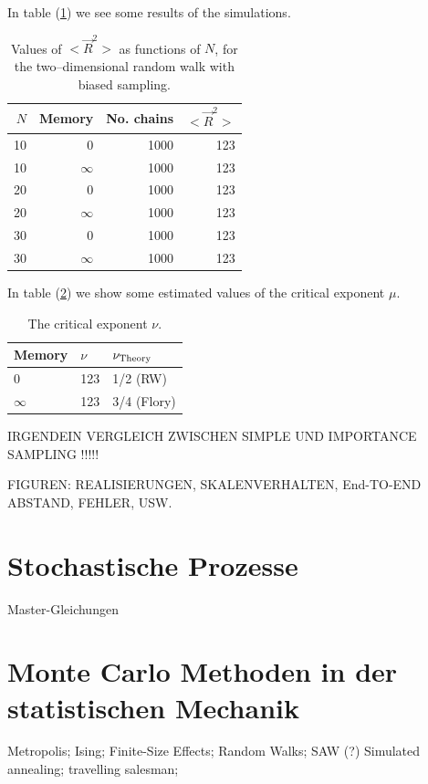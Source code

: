 In table (\ref{T_SAW}) we see some results of the simulations.
\begin{table}
\label{T_SAW}
\caption{Values of $<\vec{R}^2>$ as functions of $N$, 
for the two--dimensional random walk with biased sampling.}
\begin{tabular}{rrrr} \hline \hline
$N$ & Memory & No. chains & $<\vec{R}^2>$ \\ \hline
10  & 0        & 1000     &    123 \\
10  & $\infty$ & 1000     & 123 \\
20  & 0        & 1000     & 123   \\
20  & $\infty$ & 1000     & 123 \\
30  & 0        & 1000     & 123 \\ 
30  & $\infty$ & 1000     & 123 \\ \hline \hline
\end{tabular}
\end{table}


In table (\ref{T_SAW_NU}) we show some estimated values of 
the critical exponent $\mu$.
\begin{table}
\label{T_SAW_NU}
\caption{The critical exponent $\nu$.}
\begin{tabular}{lll}\hline \hline
Memory   & $\nu$ & $\nu_{\rm Theory}$ \\ \hline
0        & 123   & 1/2 (RW)  \\
$\infty$ & 123   & 3/4 (Flory)
\end{tabular}
\end{table}

IRGENDEIN VERGLEICH ZWISCHEN SIMPLE UND IMPORTANCE SAMPLING !!!!!


FIGUREN: REALISIERUNGEN, SKALENVERHALTEN, End-TO-END ABSTAND,
FEHLER, USW.


\chapter{Stochastische Prozesse}
Master-Gleichungen

\chapter{Monte Carlo Methoden in der statistischen Mechanik}
Metropolis; Ising; Finite-Size Effects; Random Walks; SAW (?)
Simulated annealing; travelling salesman;

